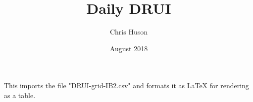 \documentclass[12pt, oneside]{article}
\title{Daily DRUI}
\author{Chris Huson}
\date{August 2018}
\begin{document}
This imports the file "DRUI-grid-IB2.csv" and formats it as LaTeX for rendering as a table.

\end{document}
